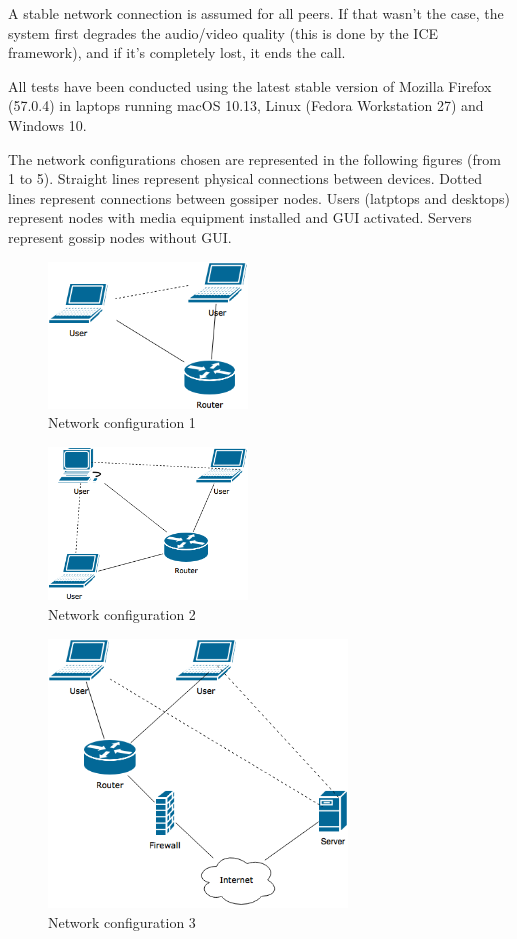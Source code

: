 \documentclass[paper=a4, fontsize=11pt]{scrartcl} %
\numberwithin{equation}{section} %
\numberwithin{figure}{section} %
\numberwithin{table}{section} %
\begin{document}
A stable network connection is assumed for all peers. If that wasn't the case, the system first degrades the audio/video quality (this is done by the ICE framework), and if it's completely lost, it ends the call.

All tests have been conducted using the latest stable version of Mozilla Firefox (57.0.4) in laptops running macOS 10.13, Linux (Fedora Workstation 27) and Windows 10.

The network configurations chosen are represented in the following figures (from 1 to 5). Straight lines represent physical connections between devices. Dotted lines represent connections between gossiper nodes. Users (latptops and desktops) represent nodes with media equipment installed and GUI activated. Servers represent gossip nodes without GUI.

\begin{figure}[ht!]
	\centering
	\includegraphics[width=200px]{network-config-1.png}
	\caption{Network configuration 1}
\end{figure}

\begin{figure}[ht!]
	\centering
	\includegraphics[width=200px]{network-config-2.png}
	\caption{Network configuration 2}
\end{figure}

\begin{figure}[ht!]
	\centering
	\includegraphics[width=300px]{network-config-3.png}
	\caption{Network configuration 3}
\end{figure}
\end{document}
